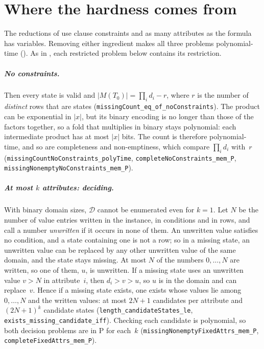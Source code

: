 \documentclass[pdflatex,sn-mathphys-num]{sn-jnl}
\theoremstyle{thmstyleone}
\theoremstyle{thmstylethree}
\begin{document}
\section{Where the hardness comes from}
\label{sec:boundary}

The reductions of  use clause constraints and as many
attributes as the formula has variables. Removing either ingredient makes all three problems
polynomial-time (). As in , each restricted problem
below contains its restriction.

\subparagraph*{No constraints.}
Then every state is valid and $|M(T_0)| = \prod_i d_i - r$, where $r$ is the number of
\emph{distinct} rows that are states (\lstinline{missingCount_eq_of_noConstraints}). The product
can be exponential in $|x|$, but its binary encoding is no longer than those of the factors
together, so a fold that multiplies in binary stays polynomial: each intermediate product has
at most $|x|$ bits. The count is therefore polynomial-time, and so are completeness and
non-emptiness, which compare $\prod_i d_i$ with~$r$ (\lstinline{missingCountNoConstraints_polyTime},
\lstinline{completeNoConstraints_mem_P}, \lstinline{missingNonemptyNoConstraints_mem_P}).

\subparagraph*{At most $k$ attributes: deciding.}
With binary domain sizes, $\mathcal{D}$ cannot be enumerated even for $k = 1$. Let $N$ be the
number of value entries written in the instance, in conditions and in rows, and call a number
\emph{unwritten} if it occurs in none of them. An unwritten value satisfies no condition, and a
state containing one is not a row; so in a missing state, an unwritten value can be replaced by
any other unwritten value of the same domain, and the state stays missing. At most $N$ of the
numbers $0, \dots, N$ are written, so one of them, $u$, is unwritten. If a missing state uses an
unwritten value $v > N$ in attribute~$i$, then $d_i > v > u$, so $u$ is in the domain and can
replace~$v$. Hence if a missing state exists, one exists whose values lie among $0, \dots, N$
and the written values: at most $2N+1$ candidates per attribute and $(2N+1)^k$ candidate
states (\lstinline{length_candidateStates_le},
\lstinline{exists_missing_candidate_iff}). Checking each candidate is polynomial, so both decision
problems are in P for each~$k$ (\lstinline{missingNonemptyFixedAttrs_mem_P},
\lstinline{completeFixedAttrs_mem_P}).
\end{document}
